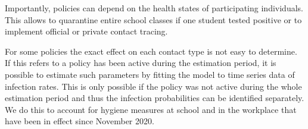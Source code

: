Importantly, policies can depend on the health states of participating individuals.
This allows to quarantine entire school classes if one student tested positive or
to implement official or private contact tracing.

For some policies the exact effect on each contact type is not easy to determine. If
this refers to a policy has been active during the estimation period, it is possible to
estimate such parameters by fitting the model to time series data of infection rates.
This is only possible if the policy was not active during the whole estimation period
and thus the infection probabilities can be identified separately. We do this to account
for hygiene measures at school and in the workplace that have been in effect since
November 2020.

